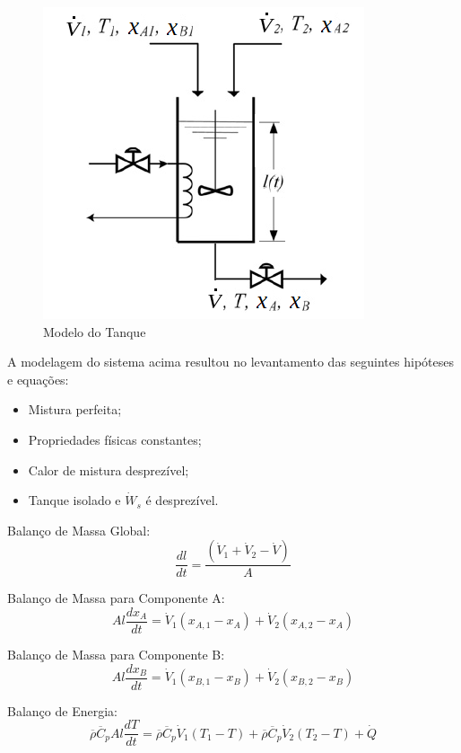 \documentclass[
	12pt,				%
	openright,			%
	oneside,			%
	a4paper,			%
	english,			%
	french,				%
	spanish,			%
	brazil				%
	]{abntex2}
\begin{document}
\begin{figure}[!h]
\centering
\includegraphics[scale=0.6]{1a.png} 
\caption{Modelo do Tanque}
\label{Modelo do Tanque}
\end{figure}

A modelagem do sistema acima resultou no levantamento das seguintes hipóteses e equações:

\begin{itemize}
\item Mistura perfeita;
\item Propriedades físicas constantes;
\item Calor de mistura desprezível;
\item Tanque isolado e $\dot{W}_{s}$ é desprezível.
\end{itemize}

Balanço de Massa Global:
\begin{equation}
\frac{dl}{dt}=\frac{(\dot{V}_{1}+\dot{V}_{2}-\dot{V})}{A}
\end{equation}

Balanço de Massa para Componente A:
\begin{equation}
Al\frac{dx_{A}}{dt}=\dot{V}_{1}(x_{A,1}-x_{A})+\dot{V}_{2}(x_{A,2}-x_{A})
\end{equation}

Balanço de Massa para Componente B:
\begin{equation}
Al\frac{dx_{B}}{dt}=\dot{V}_{1}(x_{B,1}-x_{B})+\dot{V}_{2}(x_{B,2}-x_{B})
\end{equation}

Balanço de Energia:
\begin{equation}
\overline{\rho}\overline{C}_{p}Al\frac{dT}{dt}=\overline{\rho}\overline{C}_{p}\dot{V}_{1}(T_{1}-T)+\overline{\rho}\overline{C}_{p}\dot{V}_{2}(T_{2}-T)+\dot{Q}
\end{equation}
\end{document}
